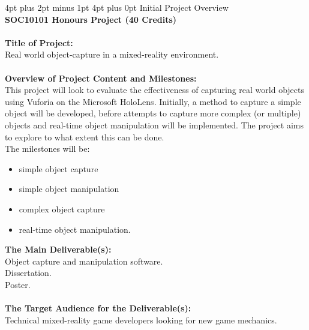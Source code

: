 \documentclass[12pt,a4paper,oneside]{article}
\makeatletter
\renewcommand\section{\@startsection {section}{1}{0mm} %
                               {4pt plus 2pt minus 1pt} %
                               {4pt plus 0pt} %
                               {\Large\bfseries}}
\makeatother
\begin{document}
\newpage
\begin{singlespace}	


\end{singlespace}


\newpage
\begin{appendices}
\section{Initial Project Overview}
 \ \\ \textbf{SOC10101 Honours Project (40 Credits)} \\ \\
\textbf{Title of Project:} \\
Real world object-capture in a mixed-reality environment. \\ \\
\textbf{Overview of Project Content and Milestones:} \\
This project will look to evaluate the effectiveness of capturing real world objects using Vuforia on the Microsoft HoloLens. Initially, a method to capture a simple object will be developed, before attempts to capture more complex (or multiple) objects and real-time object manipulation will be implemented. The project aims to explore to what extent this can be done. \\
The milestones will be: 
\begin{itemize}\itemsep0pt
	\item simple object capture
	\item simple object manipulation
	\item complex object capture
	\item real-time object manipulation.
\end{itemize}
\textbf{The Main Deliverable(s):} \\
Object capture and manipulation software. \\
Dissertation. \\
Poster. \\ \\
\textbf{The Target Audience for the Deliverable(s):} \\
Technical mixed-reality game developers looking for new game mechanics. \\

\end{appendices}
\end{document}
